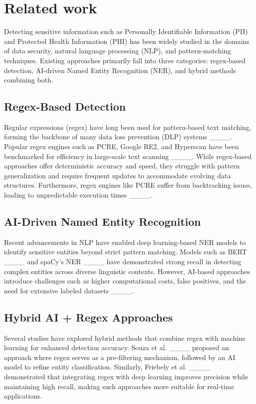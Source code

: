 \section{Related work}
\label{sec:Literature review 
}
Detecting sensitive information such as Personally Identifiable Information (PII) and Protected Health Information (PHI) has been widely studied in the domains of data security, natural language processing (NLP), and pattern-matching techniques. Existing approaches primarily fall into three categories: regex-based detection, AI-driven Named Entity Recognition (NER), and hybrid methods combining both.

\subsection{Regex-Based Detection}
Regular expressions (regex) have long been used for pattern-based text matching, forming the backbone of many data loss prevention (DLP) systems ____. Popular regex engines such as PCRE, Google RE2, and Hyperscan have been benchmarked for efficiency in large-scale text scanning ____. While regex-based approaches offer deterministic accuracy and speed, they struggle with pattern generalization and require frequent updates to accommodate evolving data structures. Furthermore, regex engines like PCRE suffer from backtracking issues, leading to unpredictable execution times ____.

\subsection{AI-Driven Named Entity Recognition}
Recent advancements in NLP have enabled deep learning-based NER models to identify sensitive entities beyond strict pattern matching. Models such as BERT ____ and spaCy's NER ____ have demonstrated strong recall in detecting complex entities across diverse linguistic contexts. However, AI-based approaches introduce challenges such as higher computational costs, false positives, and the need for extensive labeled datasets ____.

\subsection{Hybrid AI + Regex Approaches}
Several studies have explored hybrid methods that combine regex with machine learning for enhanced detection accuracy. Souza et al. ____ proposed an approach where regex serves as a pre-filtering mechanism, followed by an AI model to refine entity classification. Similarly, Friebely et al. ____ demonstrated that integrating regex with deep learning improves precision while maintaining high recall, making such approaches more suitable for real-time applications.

